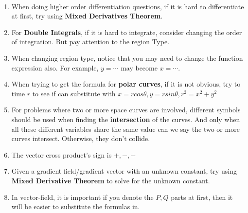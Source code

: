 \documentclass[10pt, landscape]{article}
\begin{document}
\begin{multicols}{4}
\end{multicols}

\hrulefill \\

\begin{multicols}{3}
    \begin{enumerate}
        \item When doing higher order differentiation questions, if it is hard to differentiate at first, try using \textbf{Mixed Derivatives Theorem}.
        \item For \textbf{Double Integrals}, if it is hard to integrate, consider changing the order of integration. But pay attention to the region Type.
        \item When changing region type, notice that you may need to change the function expression also. For example, $y=\cdots$ may become $x=\cdots$.
        \item When trying to get the formula for \textbf{polar curves}, if it is not obvious, try to time $r$ to see if can substitute with $x=rcos\theta, y=rsin\theta, r^2=x^2+y^2$
        \item For problems where two or more space curves are involved, different symbols should be used when finding the \textbf{intersection} of the curves. And only when all these different variables share the same value can we say the two or more curves intersect. Otherwise, they don't collide.
        \item The vector cross product's sign is $+, -, +$
        \item Given a gradient field/gradient vector with an unknown constant, try using \textbf{Mixed Derivative Theorem} to solve for the unknown constant.
        \item In vector-field, it is important if you denote the $P, Q$ parts at first, then it will be easier to substitute the formulas in.
    \end{enumerate}
\end{multicols}
\end{document}
